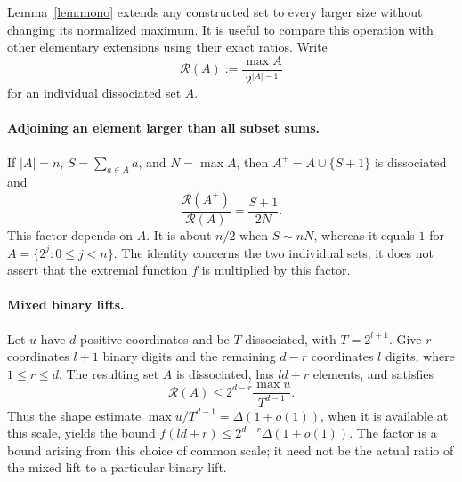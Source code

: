 \documentclass[12pt]{article}
\begin{document}
Lemma~\ref{lem:mono} extends any constructed set to every larger size
without changing its normalized maximum. It is useful to compare this
operation with other elementary extensions using their exact ratios.
Write
\[
 \mathcal R(A):=\frac{\max A}{2^{|A|-1}}
\]
for an individual dissociated set $A$.

\paragraph{Adjoining an element larger than all subset sums.}
If $|A|=n$, $S=\sum_{a\in A}a$, and $N=\max A$, then
$A^+=A\cup\{S+1\}$ is dissociated and
\[
 \frac{\mathcal R(A^+)}{\mathcal R(A)}=\frac{S+1}{2N}.
\]
This factor depends on $A$. It is about $n/2$ when $S\sim nN$,
whereas it equals $1$ for $A=\{2^j:0\le j<n\}$.
The identity concerns the two individual sets; it does not assert
that the extremal function $f$ is multiplied by this factor.

\paragraph{Mixed binary lifts.}
Let $u$ have $d$ positive coordinates and be $T$-dissociated, with
$T=2^{l+1}$. Give $r$ coordinates $l+1$ binary digits and the remaining
$d-r$ coordinates $l$ digits, where $1\le r\le d$. The resulting set
$A$ is dissociated, has $ld+r$ elements, and satisfies
\[
 \mathcal R(A)\le
 2^{d-r}\frac{\max u}{T^{d-1}}.
\]
Thus the shape estimate $\max u/T^{d-1}=\Delta(1+o(1))$, when it is
available at this scale, yields the bound
$f(ld+r)\le2^{d-r}\Delta(1+o(1))$. The factor is a bound arising
from this choice of common scale; it need not be the actual ratio of
the mixed lift to a particular binary lift.
\end{document}
